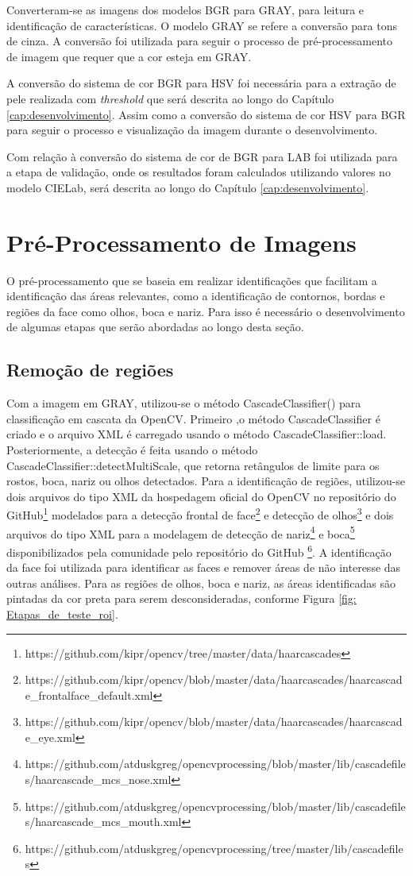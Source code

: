 Converteram-se as imagens dos modelos BGR para GRAY, para leitura e identificação de características. O modelo GRAY se refere a conversão para tons de cinza. A conversão foi utilizada para seguir o processo de pré-processamento de imagem que requer que a cor esteja em GRAY.

A conversão do sistema de cor BGR para HSV foi necessária para a extração de pele realizada com \textit{threshold} que será descrita ao longo do Capítulo \ref{cap:desenvolvimento}. Assim como a conversão do sistema de cor HSV para BGR para seguir o processo e visualização da imagem durante o desenvolvimento. 

Com relação à conversão do sistema de cor de BGR para LAB foi utilizada para a etapa de validação, onde os resultados foram calculados utilizando valores no modelo CIELab,  será descrita ao longo do Capítulo \ref{cap:desenvolvimento}.


\section{Pré-Processamento de Imagens}
O pré-processamento que se baseia em realizar identificações que facilitam a identificação das áreas relevantes, como a identificação de contornos, bordas e regiões da face como olhos, boca e nariz. Para isso é necessário o desenvolvimento de algumas etapas que serão abordadas ao longo desta seção.

\subsection{Remoção de regiões}
Com a imagem em GRAY, utilizou-se o método CascadeClassifier() para classificação em cascata da OpenCV. Primeiro ,o método CascadeClassifier é criado e o arquivo XML é carregado usando o método CascadeClassifier::load. Posteriormente, a detecção é feita usando o método CascadeClassifier::detectMultiScale, que retorna retângulos de limite para os rostos, boca, nariz ou olhos detectados. 
Para a identificação de regiões, utilizou-se dois arquivos do tipo XML da hospedagem oficial do OpenCV no repositório do GitHub\footnote{https://github.com/kipr/opencv/tree/master/data/haarcascades} modelados para a detecção frontal de face\footnote{https://github.com/kipr/opencv/blob/master/data/haarcascades/haarcascade\_frontalface\_default.xml} e detecção de olhos\footnote{https://github.com/kipr/opencv/blob/master/data/haarcascades/haarcascade\_eye.xml} e dois arquivos do tipo XML para a modelagem de detecção de nariz\footnote{https://github.com/atduskgreg/opencv\-processing/blob/master/lib/cascade\-files/haarcascade\_mcs\_nose.xml} e boca\footnote{https://github.com/atduskgreg/opencv\-processing/blob/master/lib/cascade\-files/haarcascade\_mcs\_mouth.xml} disponibilizados pela comunidade pelo repositório do GitHub \footnote{https://github.com/atduskgreg/opencv\-processing/tree/master/lib/cascade\-files}.
A identificação da face foi utilizada para identificar as faces e remover áreas de não interesse das outras análises. Para as regiões de olhos, boca e nariz, as áreas identificadas 
são pintadas da cor preta para serem desconsideradas, conforme Figura \ref{fig: Etapas_de_teste_roi}.

